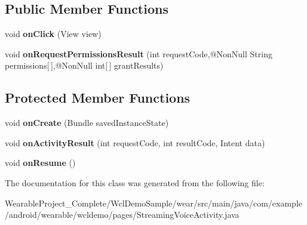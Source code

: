 \subsection*{Public Member Functions}
\begin{DoxyCompactItemize}
\item 
void {\bfseries on\+Click} (View view)\hypertarget{classcom_1_1example_1_1android_1_1wearable_1_1wcldemo_1_1pages_1_1StreamingVoiceActivity_a4ce05c6b780c6e6eebf9336080a868ef}{}\label{classcom_1_1example_1_1android_1_1wearable_1_1wcldemo_1_1pages_1_1StreamingVoiceActivity_a4ce05c6b780c6e6eebf9336080a868ef}

\item 
void {\bfseries on\+Request\+Permissions\+Result} (int request\+Code,@Non\+Null String permissions\mbox{[}$\,$\mbox{]},@Non\+Null int\mbox{[}$\,$\mbox{]} grant\+Results)\hypertarget{classcom_1_1example_1_1android_1_1wearable_1_1wcldemo_1_1pages_1_1StreamingVoiceActivity_aaf39db5f25c8e7fae828318c56a1d977}{}\label{classcom_1_1example_1_1android_1_1wearable_1_1wcldemo_1_1pages_1_1StreamingVoiceActivity_aaf39db5f25c8e7fae828318c56a1d977}

\end{DoxyCompactItemize}
\subsection*{Protected Member Functions}
\begin{DoxyCompactItemize}
\item 
void {\bfseries on\+Create} (Bundle saved\+Instance\+State)\hypertarget{classcom_1_1example_1_1android_1_1wearable_1_1wcldemo_1_1pages_1_1StreamingVoiceActivity_aca6c0be6ab38467d80fb7a0ff3611ae0}{}\label{classcom_1_1example_1_1android_1_1wearable_1_1wcldemo_1_1pages_1_1StreamingVoiceActivity_aca6c0be6ab38467d80fb7a0ff3611ae0}

\item 
void {\bfseries on\+Activity\+Result} (int request\+Code, int result\+Code, Intent data)\hypertarget{classcom_1_1example_1_1android_1_1wearable_1_1wcldemo_1_1pages_1_1StreamingVoiceActivity_ae2d69ab5604f83b5d9e509f6ef99b337}{}\label{classcom_1_1example_1_1android_1_1wearable_1_1wcldemo_1_1pages_1_1StreamingVoiceActivity_ae2d69ab5604f83b5d9e509f6ef99b337}

\item 
void {\bfseries on\+Resume} ()\hypertarget{classcom_1_1example_1_1android_1_1wearable_1_1wcldemo_1_1pages_1_1StreamingVoiceActivity_a8aefadc425357a0e0012c2e9ece8fb43}{}\label{classcom_1_1example_1_1android_1_1wearable_1_1wcldemo_1_1pages_1_1StreamingVoiceActivity_a8aefadc425357a0e0012c2e9ece8fb43}

\end{DoxyCompactItemize}


The documentation for this class was generated from the following file\+:\begin{DoxyCompactItemize}
\item 
Wearable\+Project\+\_\+\+Complete/\+Wcl\+Demo\+Sample/wear/src/main/java/com/example/android/wearable/wcldemo/pages/Streaming\+Voice\+Activity.\+java\end{DoxyCompactItemize}
